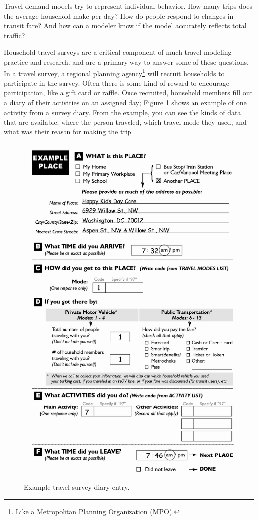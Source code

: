 \documentclass[
]{book}
\begin{document}
Travel demand models try to represent individual behavior. How many trips
does the average household make per day? How do people respond to changes in
transit fare? And how can a modeler know if the model accurately reflects
total traffic?

Household travel surveys are a critical component of much travel modeling
practice and research, and are a primary way to answer some of these questions.
In a travel survey, a regional planning
agency\footnote{Like a Metropolitan Planning Organization (MPO).} will recruit households
to participate in the survey. Often there is some kind of reward to encourage
participation, like a gift card or raffle. Once recruited, household members
fill out a diary of their activities on an assigned day; Figure
\ref{fig:travel-diary} shows an example of one activity from a survey diary.
From the example, you can see the kinds of data that are available: where the
person traveled, which travel mode they used, and what was their reason for
making the trip.

\begin{figure}
\includegraphics[width=0.7\linewidth]{images/travel_diary} \caption{Example travel survey diary entry.}\label{fig:travel-diary}
\end{figure}
\end{document}
